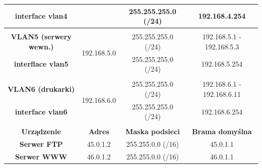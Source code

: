 \documentclass{article}
\begin{document}
\begin{table}[H]
\begin{tabular}{cccc}
		\multicolumn{1}{|c|}{\textbf{interface vlan4}}       & \multicolumn{1}{c|}{}                             & \multicolumn{1}{c|}{255.255.255.0 (/24)}     & \multicolumn{1}{c|}{192.168.4.254}               \\ \hline
		&                                                   &                                              &                                                  \\ \hline
		\multicolumn{1}{|c|}{\textbf{VLAN5 (serwery wewn.)}} & \multicolumn{1}{c|}{\multirow{2}{*}{192.168.5.0}} & \multicolumn{1}{c|}{255.255.255.0 (/24)}     & \multicolumn{1}{c|}{192.168.5.1 - 192.168.5.3}   \\ \cline{1-1} \cline{3-4} 
		\multicolumn{1}{|c|}{\textbf{interflace vlan5}}      & \multicolumn{1}{c|}{}                             & \multicolumn{1}{c|}{255.255.255.0 (/24)}     & \multicolumn{1}{c|}{192.168.5.254}               \\ \hline
		&                                                   &                                              &                                                  \\ \hline
		\multicolumn{1}{|c|}{\textbf{VLAN6 (drukarki)}}      & \multicolumn{1}{c|}{\multirow{2}{*}{192.168.6.0}} & \multicolumn{1}{c|}{255.255.255.0 (/24)}     & \multicolumn{1}{c|}{192.168.6.1 - 192.168.6.11}  \\ \cline{1-1} \cline{3-4} 
		\multicolumn{1}{|c|}{\textbf{interface vlan6}}       & \multicolumn{1}{c|}{}                             & \multicolumn{1}{c|}{255.255.255.0 (/24)}     & \multicolumn{1}{c|}{192.168.6.254}               \\ \hline
		&                                                   &                                              &                                                  \\ \hline
		\multicolumn{1}{|c|}{\textbf{Urządzenie}}            & \multicolumn{1}{c|}{\textbf{Adres}}               & \multicolumn{1}{c|}{\textbf{Maska podsieci}} & \multicolumn{1}{c|}{\textbf{Brama domyślna}}     \\ \hline
		\multicolumn{1}{|c|}{\textbf{Serwer FTP}}            & \multicolumn{1}{c|}{45.0.1.2}                     & \multicolumn{1}{c|}{255.255.0.0 (/16)}       & \multicolumn{1}{c|}{45.0.1.1}                    \\ \hline
		\multicolumn{1}{|c|}{\textbf{Serwer WWW}}            & \multicolumn{1}{c|}{46.0.1.2}                     & \multicolumn{1}{c|}{255.255.0.0 (/16)}       & \multicolumn{1}{c|}{46.0.1.1}                    \\ \hline

\end{tabular}
\end{table}
\end{document}
